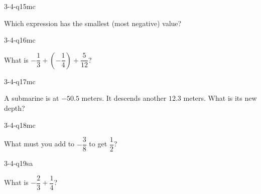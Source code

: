 \begin{practiceQuestion}{3-4-q15}{mc}
\begin{questionText}
Which expression has the smallest (most negative) value?
\end{questionText}
\end{practiceQuestion}

\begin{practiceQuestion}{3-4-q16}{mc}
\begin{questionText}
What is $-\dfrac{1}{3} + \left(-\dfrac{1}{4}\right) + \dfrac{5}{12}$?
\end{questionText}
\end{practiceQuestion}

\begin{practiceQuestion}{3-4-q17}{mc}
\begin{questionText}
A submarine is at $-50.5$ meters. It descends another $12.3$ meters. What is its new depth?
\end{questionText}
\end{practiceQuestion}

\begin{practiceQuestion}{3-4-q18}{mc}
\begin{questionText}
What must you add to $-\dfrac{3}{8}$ to get $\dfrac{1}{2}$?
\end{questionText}
\end{practiceQuestion}


\begin{practiceQuestion}{3-4-q19}{sa}
\begin{questionText}
What is $-\dfrac{2}{3} + \dfrac{1}{4}$?
\end{questionText}
\end{practiceQuestion}

